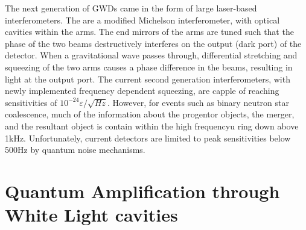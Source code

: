 \documentclass[aps,  
                a4paper, 
                amsmath, 
                amssymb, 
                preprint,
                tightenlines,  
                amsfonts,
                nofootinbib,
                onecolumn,
                titlepage,
                10pt
            ]{revtex4-2}
\begin{document}
    \par
    The next generation of GWDs came in the form of large laser-based interferometers. The are a modified Michelson interferometer, with optical cavities within the arms. The end mirrors of the arms are tuned such that the phase of the two beams destructively interferes on the output (dark port) of the detector. When a gravitational wave passes through, differential stretching and squeezing of the two arms causes a phase difference in the beams, resulting in light at the output port. The current second generation interferometers, with newly implemented frequency dependent squeezing, are capple of reaching sensitivities of $10^{-24}\varepsilon/\sqrt{Hz}$. However, for events such as binary neutron star coalescence, much of the information about the progentor objects, the merger, and the resultant object is contain within the high frequencyu ring down above 1kHz. Unfortunately, current detectors are limited to peak sensitivities below 500Hz by quantum noise mechanisms.

\section{Quantum Amplification through White Light cavities}
\end{document}
